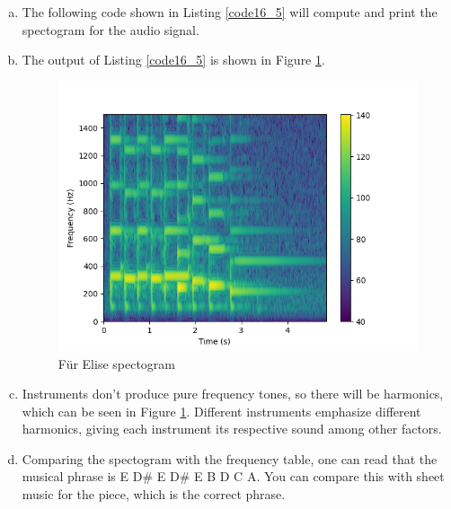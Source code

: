 \begin{enumerate}
\begin{enumerate}[a)]
\item The following code shown in Listing \ref{code16_5} will compute and print the spectogram for the audio signal. 



\item The output of Listing \ref{code16_5} is shown in Figure \ref{fur_elise_spectogram}.
\begin{figure}[h!]
    \centering
    \includegraphics[scale=1.0]{ch16/figures/fur_elise_spectogram.png}
    \caption{Für Elise spectogram}
    \label{fur_elise_spectogram}
\end{figure}

\item Instruments don't produce pure frequency tones, so there will be harmonics, which can be seen in Figure \ref{fur_elise_spectogram}. Different instruments emphasize different harmonics,
giving each instrument its respective sound among other factors. 

\item Comparing the spectogram with the frequency table, one can read that the musical phrase is E D\# E D\# E B D C A. 
You can compare this with sheet music for the piece, which is the correct phrase. 

\end{enumerate}
\end{enumerate}